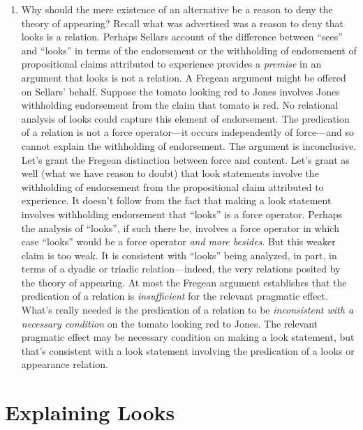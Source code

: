 \documentclass[11pt]{article}
\begin{document}
\begin{enumerate}
    \item Why should the mere existence of an alternative be a reason to deny the theory of appearing? Recall what was advertised was a reason to deny that looks is a relation. Perhaps Sellars account of the difference between ``sees'' and ``looks'' in terms of the endorsement or the withholding of endorsement of propositional claims attributed to experience provides a \emph{premise} in an argument that looks is not a relation. A Fregean argument might be offered on Sellars' behalf. Suppose the tomato looking red to Jones involves Jones withholding endorsement from the claim that tomato is red. No relational analysis of looks could capture this element of endorsement. The predication of a relation is not a force operator---it occurs independently of force---and so cannot explain the withholding of endorsement. The argument is inconclusive. Let's grant the Fregean distinction between force and content. Let's grant as well (what we have reason to doubt) that look statements involve the withholding of endorsement from the propositional claim attributed to experience. It doesn't follow from the fact that making a look statement involves withholding endorsement that ``looks'' is a force operator. Perhaps the analysis of ``looks'', if such there be, involves a force operator in which case ``looks'' would be a force operator\emph{ and more besides}. But this weaker claim is too weak. It is consistent with ``looks'' being analyzed, in part, in terms of a dyadic or triadic relation---indeed, the very relations posited by the theory of appearing. At most the Fregean argument establishes that the predication of a relation is \emph{insufficient} for the relevant pragmatic effect. What's really needed is the predication of a relation to be \emph{inconsistent with a necessary condition} on the tomato looking red to Jones. The relevant pragmatic effect may be necessary condition on making a look statement, but that's consistent with a look statement involving the predication of a looks or appearance relation.
\end{enumerate}


\section{Explaining Looks} %
\label{sec:explaining_looks}
\end{document}
